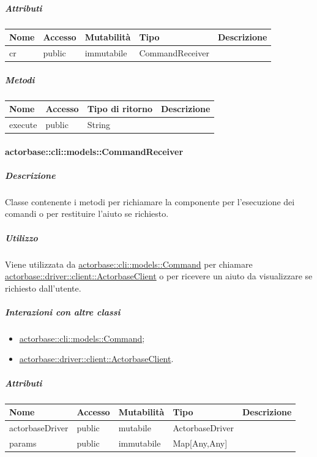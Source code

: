 \documentclass{scalatekids-article}
\begin{document}
\subparagraph{Attributi}

\begin{tabular}{| l | l | l | l | l |}
  \hline
  Nome & Accesso & Mutabilità & Tipo & Descrizione\\
  \hline
  cr & public & immutabile & CommandReceiver & \\
  \hline
\end{tabular}

\subparagraph{Metodi}

\begin{tabular}{| l | l | l | l |}
  \hline
  Nome & Accesso & Tipo di ritorno & Descrizione\\
  \hline
  execute & public & String & \\
  \hline
\end{tabular}

\paragraph{actorbase::cli::models::CommandReceiver}
\label{sec:actorbase::cli::models::CommandReceiver}

\subparagraph{Descrizione}

Classe contenente i metodi per richiamare la componente  per
l'esecuzione dei comandi o per restituire l'aiuto se richiesto.

\subparagraph{Utilizzo}

Viene utilizzata da \hyperref[sec:actorbase::cli::models::Command]{actorbase::cli::models::Command} per chiamare
\hyperref[sec:actorbase::driver::client::ActorbaseClient]{actorbase::driver::client::ActorbaseClient} o per ricevere un aiuto da
visualizzare se richiesto dall'utente.

\subparagraph{Interazioni con altre classi}

\begin{itemize}
\item \hyperref[sec:actorbase::cli::models::Command]{actorbase::cli::models::Command};
\item \hyperref[sec:actorbase::driver::client::ActorbaseClient]{actorbase::driver::client::ActorbaseClient}.
\end{itemize}

\subparagraph{Attributi}

\begin{tabular}{| l | l | l | l | l |}
  \hline
  Nome & Accesso & Mutabilità & Tipo & Descrizione\\
  \hline
  actorbaseDriver & public & mutabile & ActorbaseDriver & \\
  \hline
  params & public & immutabile & Map[Any,Any] & \\
  \hline
\end{tabular}
\end{document}
